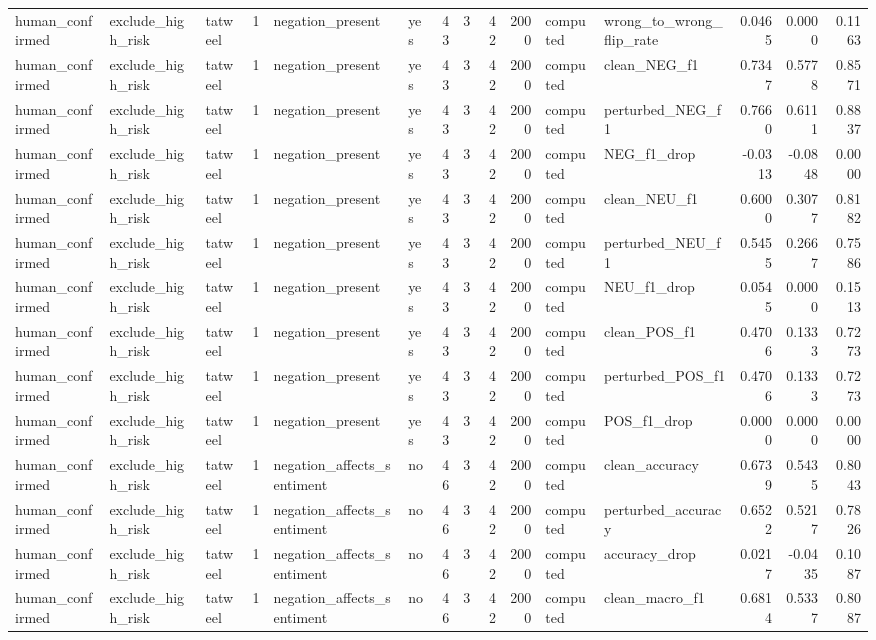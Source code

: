\begin{tabular}{lllrllrrrrllrrr}
human_confirmed & exclude_high_risk & tatweel & 1 & negation_present & yes & 43 & 3 & 42 & 2000 & computed & wrong_to_wrong_flip_rate & 0.0465 & 0.0000 & 0.1163 \\
human_confirmed & exclude_high_risk & tatweel & 1 & negation_present & yes & 43 & 3 & 42 & 2000 & computed & clean_NEG_f1 & 0.7347 & 0.5778 & 0.8571 \\
human_confirmed & exclude_high_risk & tatweel & 1 & negation_present & yes & 43 & 3 & 42 & 2000 & computed & perturbed_NEG_f1 & 0.7660 & 0.6111 & 0.8837 \\
human_confirmed & exclude_high_risk & tatweel & 1 & negation_present & yes & 43 & 3 & 42 & 2000 & computed & NEG_f1_drop & -0.0313 & -0.0848 & 0.0000 \\
human_confirmed & exclude_high_risk & tatweel & 1 & negation_present & yes & 43 & 3 & 42 & 2000 & computed & clean_NEU_f1 & 0.6000 & 0.3077 & 0.8182 \\
human_confirmed & exclude_high_risk & tatweel & 1 & negation_present & yes & 43 & 3 & 42 & 2000 & computed & perturbed_NEU_f1 & 0.5455 & 0.2667 & 0.7586 \\
human_confirmed & exclude_high_risk & tatweel & 1 & negation_present & yes & 43 & 3 & 42 & 2000 & computed & NEU_f1_drop & 0.0545 & 0.0000 & 0.1513 \\
human_confirmed & exclude_high_risk & tatweel & 1 & negation_present & yes & 43 & 3 & 42 & 2000 & computed & clean_POS_f1 & 0.4706 & 0.1333 & 0.7273 \\
human_confirmed & exclude_high_risk & tatweel & 1 & negation_present & yes & 43 & 3 & 42 & 2000 & computed & perturbed_POS_f1 & 0.4706 & 0.1333 & 0.7273 \\
human_confirmed & exclude_high_risk & tatweel & 1 & negation_present & yes & 43 & 3 & 42 & 2000 & computed & POS_f1_drop & 0.0000 & 0.0000 & 0.0000 \\
human_confirmed & exclude_high_risk & tatweel & 1 & negation_affects_sentiment & no & 46 & 3 & 42 & 2000 & computed & clean_accuracy & 0.6739 & 0.5435 & 0.8043 \\
human_confirmed & exclude_high_risk & tatweel & 1 & negation_affects_sentiment & no & 46 & 3 & 42 & 2000 & computed & perturbed_accuracy & 0.6522 & 0.5217 & 0.7826 \\
human_confirmed & exclude_high_risk & tatweel & 1 & negation_affects_sentiment & no & 46 & 3 & 42 & 2000 & computed & accuracy_drop & 0.0217 & -0.0435 & 0.1087 \\
human_confirmed & exclude_high_risk & tatweel & 1 & negation_affects_sentiment & no & 46 & 3 & 42 & 2000 & computed & clean_macro_f1 & 0.6814 & 0.5337 & 0.8087 \\

\end{tabular}
